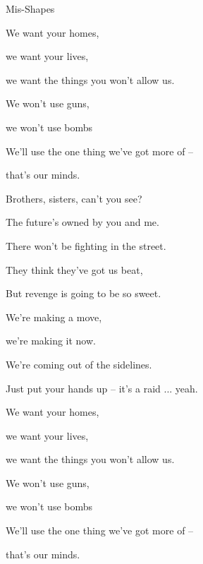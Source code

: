 \begin{song}{Mis-Shapes}{

    \chordset[Verse]{ \AMaj \EMaj \Fshm \DMaj \DSeven}

    \chordset[Chorus]{ \GMaj \GMajSeven \GSeven \CMaj \CMajSeven \CSeven }
	
	\chordset{ \Em \EmSix \EmaddC }

}
\begin{songverse}
		We want your homes,

		we want your lives,

		we want the things you won't allow us. 

		We won't use guns, 

		we won't use bombs

		We'll use the one thing we've got more of --

		that's our minds.  \hspace{30pt}  \qquad {}

	\end{songverse}

	\begin{songverse}
				Brothers, sisters, can't you see? 

		The future's owned by you and me. 

		There won't be fighting in the street. 

		They think they've got us beat, 

		But revenge is going to be so sweet. 
	\end{songverse}

	\begin{songverse}		

		
		 \quad We're making a move, 

		we're making it now. 

		We're coming out of the sidelines. 

		\quad Just put your hands up -- it's a raid ... yeah.

		We want your homes,

		we want your lives,

		we want the things you won't allow us. 

		We won't use guns, 

		we won't use bombs

		We'll use the one thing we've got more of --

		that's our minds.  \hspace{30pt}  \qquad \ch{Em}

	 \end{songverse}

\end{song}